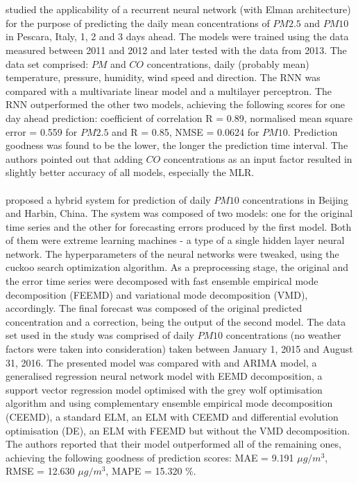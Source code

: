 \\\\
\cite{BIANCOFIORE2017652} studied the applicability of a recurrent neural network (with Elman architecture) for the purpose of predicting the daily mean concentrations of $PM2.5$ and $PM10$ in Pescara, Italy,  1, 2 and 3 days ahead. The models were trained using the data measured between 2011 and 2012 and later tested with the data from 2013. The data set comprised: $PM$ and $CO$ concentrations, daily (probably mean) temperature, pressure, humidity, wind speed and direction. The RNN was compared with a multivariate linear model and a multilayer perceptron. The RNN outperformed the other two models, achieving the following scores for one day ahead prediction: coefficient of correlation R = 0.89, normalised mean square error = 0.559 for $PM2.5$ and R = 0.85, NMSE = 0.0624 for $PM10$. Prediction goodness was found to be the lower, the longer the prediction time interval. The authors pointed out that adding $CO$ concentrations as an input factor resulted in slightly better accuracy of all models, especially the MLR.
\\\\
\cite{LUO201834} proposed a hybrid system for prediction of daily $PM10$ concentrations in Beijing and Harbin, China. The system was composed of two models: one for the original time series and the other for forecasting errors produced by the first model. Both of them were extreme learning machines - a type of a single hidden layer neural network. The hyperparameters of the neural networks were tweaked, using the cuckoo search optimization algorithm. As a preprocessing stage, the original and the error time series were decomposed with fast ensemble empirical mode decomposition (FEEMD) and variational mode decomposition (VMD), accordingly. The final forecast was composed of the original predicted concentration and a correction, being the output of the second model.
The data set used in the study was comprised of daily $PM10$ concentrations (no weather factors were taken into consideration) taken between January 1, 2015 and August 31, 2016. The presented model was compared with and ARIMA model, a generalised regression neural network model with EEMD decomposition, a support vector regression model optimised with the grey wolf optimisation algorithm and using complementary ensemble empirical mode decomposition (CEEMD), a standard ELM, an ELM with CEEMD and differential evolution optimisation (DE), an ELM with FEEMD but without the VMD decomposition. The authors reported that their model outperformed all of the remaining ones, achieving the following goodness of prediction scores: MAE = 9.191 $\mu g / m^3$, RMSE = 12.630 $\mu g / m^3$, MAPE = 15.320 \%.
